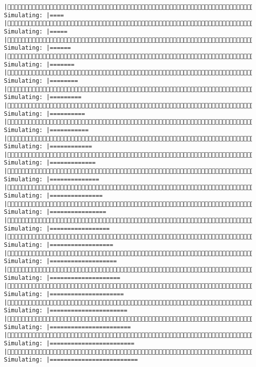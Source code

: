 \documentclass[]{article}
\begin{document}
\begin{verbatim}
|(1/4) Simulating: |====                                                   |(1/4) Simulating: |=====                                                  |(1/4) Simulating: |======                                                 |(1/4) Simulating: |=======                                                |(1/4) Simulating: |========                                               |(1/4) Simulating: |=========                                              |(1/4) Simulating: |==========                                             |(1/4) Simulating: |===========                                            |(1/4) Simulating: |============                                           |(1/4) Simulating: |=============                                          |(1/4) Simulating: |==============                                         |(1/4) Simulating: |===============                                        |(1/4) Simulating: |================                                       |(1/4) Simulating: |=================                                      |(1/4) Simulating: |==================                                     |(1/4) Simulating: |===================                                    |(1/4) Simulating: |====================                                   |(1/4) Simulating: |=====================                                  |(1/4) Simulating: |======================                                 |(1/4) Simulating: |=======================                                |(1/4) Simulating: |========================                               |(1/4) Simulating: |=========================                              
\end{verbatim}
\end{document}
